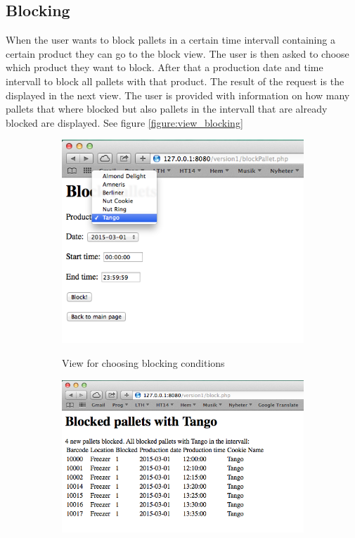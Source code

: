 \documentclass[a4paper]{scrartcl}
\numberwithin{equation}{section}
\begin{document}
\subsection*{Blocking}

When the user wants to block pallets in a certain time intervall containing a certain product they can go to the block view. The user is then asked to choose which product they want to block. After that a production date and time intervall to block all pallets with that product. The result of the request is the displayed in the next view. The user is provided with information on how many pallets that where blocked but also pallets in the intervall that are already blocked are displayed. See figure \ref{figure:view_blocking}

\begin{figure}[h!]
  \centering
  	\begin{subfigure}[b]{0.45\textwidth}
    	\includegraphics[width=\textwidth]{figures/view_block.png}
    	\label{figure:view_block}
    	\caption{View for choosing blocking conditions}
 		\end{subfigure}	
 		\begin{subfigure}[b]{0.45\textwidth}
    	\includegraphics[width=\textwidth]{figures/view_blockResult.png}

\end{subfigure}
\end{figure}
\end{document}
